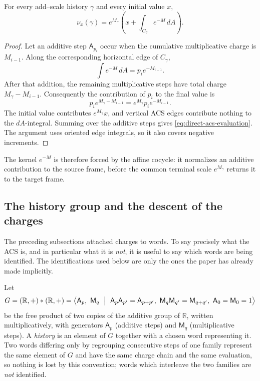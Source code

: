 \begin{proposition}
\label{prop:acs-evaluation}
For every add--scale history \(\gamma\) and every initial value \(x\),
\begin{equation}
    \nu_x(\gamma)
      =e^{M_\gamma}
        \left(x+\int_{C_\gamma}e^{-M}\,dA\right).
    \label{eq:direct-acs-evaluation}
\end{equation}
\end{proposition}

\begin{proof}
Let an additive step \(\mathsf A_{p_i}\) occur when the cumulative
multiplicative charge is \(M_{i-1}\).  Along the corresponding horizontal edge
of \(C_\gamma\),
\[
    \int e^{-M}\,dA=p_i e^{-M_{i-1}}.
\]
After that addition, the remaining multiplicative steps have total charge
\(M_\gamma-M_{i-1}\).  Consequently the contribution of \(p_i\) to the final
value is
\[
    p_i e^{M_\gamma-M_{i-1}}
      =e^{M_\gamma}p_i e^{-M_{i-1}}.
\]
The initial value contributes \(e^{M_\gamma}x\), and vertical ACS edges
contribute nothing to the \(dA\)-integral.  Summing over the additive steps
gives \eqref{eq:direct-acs-evaluation}.  The argument uses oriented edge
integrals, so it also covers negative increments.
\end{proof}

The kernel \(e^{-M}\) is therefore forced by the affine cocycle: it normalizes
an additive contribution to the source frame, before the common terminal scale
\(e^{M_\gamma}\) returns it to the target frame.

\subsection{The history group and the descent of the charges}
\label{subsec:p0-history-group}

The preceding subsections attached charges to words.  To say precisely what the
ACS is, and in particular what it is \emph{not}, it is useful to say which words are
being identified.  The identifications used below are only the ones the paper
has already made implicitly.

\begin{convention}
\label{conv:p0-history-group}
Let
\[
  G=(\mathbb R,+)*(\mathbb R,+)
  =\bigl\langle \mathsf A_p,\ \mathsf M_q\ \bigm|\
    \mathsf A_p\mathsf A_{p'}=\mathsf A_{p+p'},\
    \mathsf M_q\mathsf M_{q'}=\mathsf M_{q+q'},\
    \mathsf A_0=\mathsf M_0=1 \bigr\rangle
\]
be the free product of two copies of the additive group of $\mathbb R$, written
multiplicatively, with generators $\mathsf A_p$ (additive steps) and
$\mathsf M_q$ (multiplicative steps).  A \emph{history} is an element of $G$
together with a chosen word representing it.  Two words differing only by
regrouping consecutive steps of one family represent the same element of $G$ and
have the same charge chain and the same evaluation, so nothing is lost by this
convention; words which interleave the two families are \emph{not} identified.
\end{convention}

